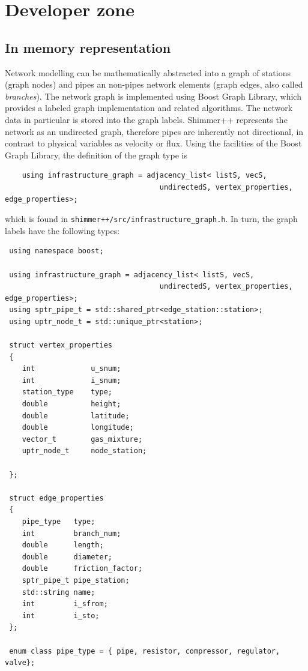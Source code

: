 \clearpage
\section{Developer zone} \label{sec: developer_zone}

\subsection{In memory representation} \label{sec:memory}
Network modelling can be mathematically abstracted into a graph of stations (graph nodes) and pipes an non-pipes network elements (graph edges, also called \textit{branches}). The network graph is implemented using Boost Graph Library, which provides a labeled graph implementation and related algorithms. The network data in particular is stored into the graph labels. Shimmer++ represents the network as an undirected graph, therefore pipes are inherently not directional, in contrast to physical variables as velocity or flux. Using the facilities of the Boost Graph Library, the definition of the graph type is
\begin{verbatim}
    using infrastructure_graph = adjacency_list< listS, vecS,
                                    undirectedS, vertex_properties, edge_properties>;    
\end{verbatim}    
which is found in \texttt{shimmer++/src/infrastructure\_graph.h}. In turn, the graph
labels have the following types:
\begin{verbatim}
 using namespace boost;

 using infrastructure_graph = adjacency_list< listS, vecS,
                                    undirectedS, vertex_properties, edge_properties>;
 using sptr_pipe_t = std::shared_ptr<edge_station::station>; 
 using uptr_node_t = std::unique_ptr<station>;
 
 struct vertex_properties                       
 {                                              
    int             u_snum;                     
    int             i_snum;                     
    station_type    type;                       
    double          height;                     
    double          latitude;                   
    double          longitude;                  
    vector_t        gas_mixture;                
    uptr_node_t     node_station;               
                                                  
 };

 struct edge_properties 
 {
    pipe_type   type;
    int         branch_num;
    double      length;
    double      diameter;
    double      friction_factor;
    sptr_pipe_t pipe_station;
    std::string name;
    int         i_sfrom;
    int         i_sto;          
 };  

 enum class pipe_type = { pipe, resistor, compressor, regulator,  valve};
\end{verbatim}

